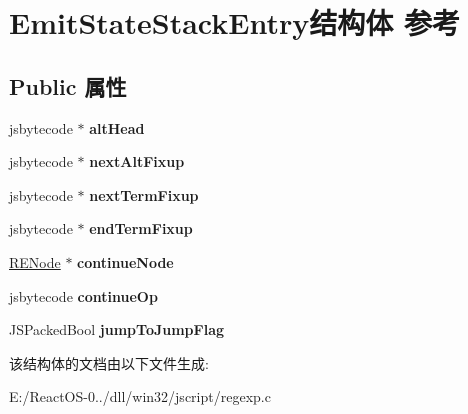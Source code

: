 \hypertarget{struct_emit_state_stack_entry}{}\section{Emit\+State\+Stack\+Entry结构体 参考}
\label{struct_emit_state_stack_entry}
\subsection*{Public 属性}
\begin{DoxyCompactItemize}
\item 
\mbox{\label{struct_emit_state_stack_entry_a88ccfd5d0985026d45622d37d17158e6}} 
jsbytecode $\ast$ {\bfseries alt\+Head}
\item 
\mbox{\label{struct_emit_state_stack_entry_a6e6d2731c2afe364d697eaf68074aa10}} 
jsbytecode $\ast$ {\bfseries next\+Alt\+Fixup}
\item 
\mbox{\label{struct_emit_state_stack_entry_a93906d5334c600f43031a99ee00d2012}} 
jsbytecode $\ast$ {\bfseries next\+Term\+Fixup}
\item 
\mbox{\label{struct_emit_state_stack_entry_a16a46de04c335efcc442dbac2d6e626c}} 
jsbytecode $\ast$ {\bfseries end\+Term\+Fixup}
\item 
\mbox{\label{struct_emit_state_stack_entry_a0c7566f6ef8fcab12ce2b25b3abe2e8c}} 
\hyperlink{struct_r_e_node}{R\+E\+Node} $\ast$ {\bfseries continue\+Node}
\item 
\mbox{\label{struct_emit_state_stack_entry_a5f9fbb3a63fe03ed581e85bb580cee30}} 
jsbytecode {\bfseries continue\+Op}
\item 
\mbox{\label{struct_emit_state_stack_entry_ae15e8dd8230c5fe614840d6293b31898}} 
J\+S\+Packed\+Bool {\bfseries jump\+To\+Jump\+Flag}
\end{DoxyCompactItemize}


该结构体的文档由以下文件生成\+:\begin{DoxyCompactItemize}
\item 
E\+:/\+React\+O\+S-\/0../dll/win32/jscript/regexp.\+c\end{DoxyCompactItemize}
